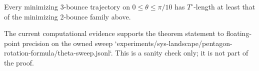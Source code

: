 \begin{unverified}
\begin{lemma}
\label{lem:pentagon-rotation-three-bounce}
Every minimizing 3-bounce trajectory on $0 \le \theta \le \pi/10$ has
$T^\circ$-length at least that of the minimizing 2-bounce family above.
\end{lemma}

\end{unverified}

\begin{unverified}
\begin{remark}
The current computational evidence supports the theorem statement to
floating-point precision on the owned sweep
`experiments/sys-landscape/pentagon-rotation-formula/theta-sweep.jsonl`.
This is a sanity check only; it is not part of the proof.
\end{remark}
\end{unverified}
